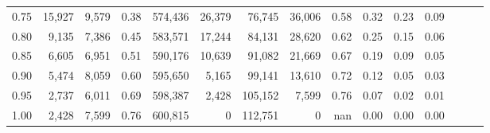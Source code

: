 \begin{tabular}{rrrrrrrrrrrrrrr}
0.75 &  15,927 &  9,579 &  0.38 &  574,436 &   26,379 &   76,745 &   36,006 &  0.58 &  0.32 &  0.23 &      0.09 \\
0.80 &   9,135 &  7,386 &  0.45 &  583,571 &   17,244 &   84,131 &   28,620 &  0.62 &  0.25 &  0.15 &      0.06 \\
0.85 &   6,605 &  6,951 &  0.51 &  590,176 &   10,639 &   91,082 &   21,669 &  0.67 &  0.19 &  0.09 &      0.05 \\
0.90 &   5,474 &  8,059 &  0.60 &  595,650 &    5,165 &   99,141 &   13,610 &  0.72 &  0.12 &  0.05 &      0.03 \\
0.95 &   2,737 &  6,011 &  0.69 &  598,387 &    2,428 &  105,152 &    7,599 &  0.76 &  0.07 &  0.02 &      0.01 \\
1.00 &   2,428 &  7,599 &  0.76 &  600,815 &        0 &  112,751 &        0 &   nan &  0.00 &  0.00 &      0.00 \\
\bottomrule
\end{tabular}
